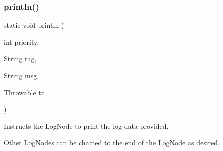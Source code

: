 \subsubsection{\texorpdfstring{println()}{println()}\hspace{0.1cm}{\footnotesize\ttfamily [1/2]}}
{\footnotesize\ttfamily static void println (\begin{DoxyParamCaption}\item[{int}]{priority,  }\item[{String}]{tag,  }\item[{String}]{msg,  }\item[{Throwable}]{tr }\end{DoxyParamCaption})\hspace{0.3cm}{\ttfamily [static]}}



Instructs the Log\+Node to print the log data provided. 

Other Log\+Nodes can be chained to the end of the Log\+Node as desired.


